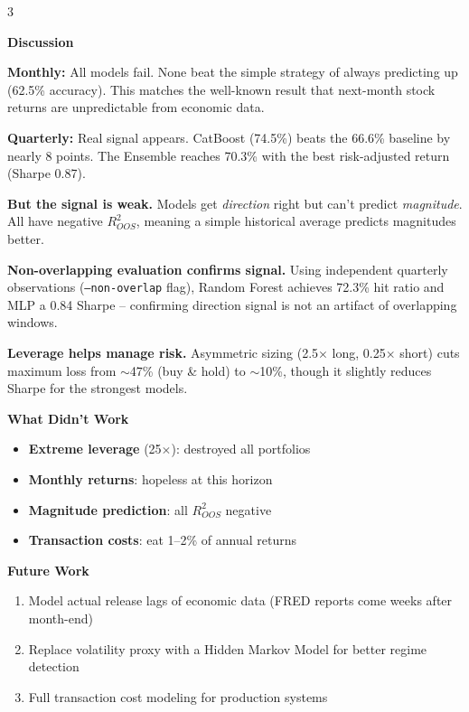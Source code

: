 \documentclass[12pt]{article}
\newcommand{\postersection}[1]{%
  \vspace{0.5em}
  \noindent
  \hspace*{-\leftskip}%
  \colorbox{rhgreen}{\parbox{\dimexpr\linewidth-\rightskip-2\fboxsep\relax}{\textcolor{rhbg}{\textbf{\LARGE #1}}}}\par
  \vspace{0.3em}
}
\begin{document}
\begin{multicols}{3}
\columnbreak

\postersection{Discussion}

\large
\textbf{Monthly:} All models fail. None beat the simple strategy of always
predicting up (62.5\% accuracy). This matches the well-known result that
next-month stock returns are unpredictable from economic data.

\textbf{Quarterly:} Real signal appears. CatBoost (74.5\%) beats the 66.6\%
baseline by nearly 8 points. The Ensemble reaches 70.3\% with the best
risk-adjusted return (Sharpe 0.87).

\textbf{But the signal is weak.} Models get \textit{direction} right but
can't predict \textit{magnitude}. All have negative $R^2_{OOS}$, meaning a
simple historical average predicts magnitudes better.

\textbf{Non-overlapping evaluation confirms signal.} Using independent quarterly
observations ({\tt --non-overlap} flag), Random Forest achieves 72.3\% hit
ratio and MLP a 0.84 Sharpe -- confirming direction signal is not an artifact
of overlapping windows.

\textbf{Leverage helps manage risk.} Asymmetric sizing (2.5$\times$ long,
0.25$\times$ short) cuts maximum loss from $\sim$47\% (buy \& hold) to
$\sim$10\%, though it slightly reduces Sharpe for the strongest models.

\postersection{What Didn't Work}

\large
\begin{itemize}
  \setlength\itemsep{0.2em}
  \item \textbf{Extreme leverage} (25$\times$): destroyed all portfolios
  \item \textbf{Monthly returns}: hopeless at this horizon
  \item \textbf{Magnitude prediction}: all $R^2_{OOS}$ negative
  \item \textbf{Transaction costs}: eat 1--2\% of annual returns
\end{itemize}

\postersection{Future Work}

\large
\begin{enumerate}
  \setlength\itemsep{0.2em}
  \item Model actual release lags of economic data (FRED reports come weeks
        after month-end)
  \item Replace volatility proxy with a Hidden Markov Model for better
        regime detection
  \item Full transaction cost modeling for production systems
\end{enumerate}


\end{multicols}
\end{document}
